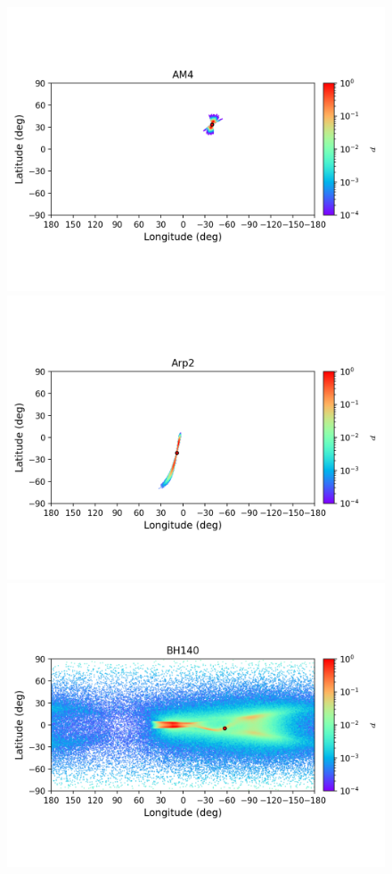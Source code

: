 \begin{figure}
        \includegraphics[clip=true, trim = 0mm 20mm 0mm 10mm, width=1\columnwidth]{images/error_plots_AM4.png}
        \includegraphics[clip=true, trim = 0mm 20mm 0mm 10mm, width=1\columnwidth]{images/error_plots_Arp2.png}
        \includegraphics[clip=true, trim = 0mm 20mm 0mm 10mm, width=1\columnwidth]{images/error_plots_BH140.png}

\end{figure}

